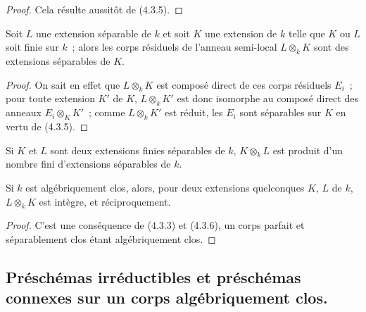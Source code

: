 \begin{proof}
Cela résulte aussitôt de (4.3.5).
\end{proof}

\begin{corollary}[4.3.7]
\label{IV.2.4.3.7-fr}
Soit $L$ une extension séparable de $k$ et soit $K$ une extension de $k$ telle
que $K$ ou $L$ soit finie sur $k$~; alors les corps résiduels de l'anneau
semi-local $L\otimes_k K$ sont des extensions séparables de $K$.
\end{corollary}

\begin{proof}
On sait en effet que $L\otimes_k K$ est composé direct de ces corps résiduels
$E_i$~; pour toute extension $K'$ de $K$, $L\otimes_k K'$ est donc isomorphe
au composé direct des anneaux $E_i\otimes_K K'$~; comme $L\otimes_k K'$ est
réduit, les $E_i$ sont séparables sur $K$ en vertu de (4.3.5).
\end{proof}

\begin{corollary}[4.3.8]
\label{IV.2.4.3.8-fr}
Si $K$ et $L$ sont deux extensions finies séparables de $k$, $K\otimes_k L$
est produit d'un nombre fini d'extensions séparables de $k$.
\end{corollary}


\begin{proposition}[4.3.9]
\label{IV.2.4.3.9-fr}
Si $k$ est algébriquement clos, alors, pour deux extensions quelconques $K$,
$L$ de $k$, $L\otimes_k K$ est intègre, et réciproquement.
\end{proposition}

\begin{proof}
C'est une conséquence de (4.3.3) et (4.3.6), un corps parfait et séparablement
clos étant algébriquement clos.
\end{proof}

\subsection{Préschémas irréductibles et préschémas connexes sur un corps
algébriquement clos.}
\label{subsection:IV.2.4.4-fr}

